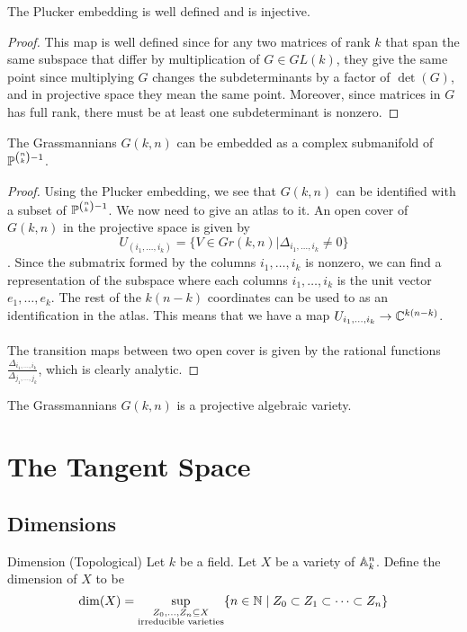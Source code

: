 \documentclass[a4paper]{article}
\begin{document}
\begin{prp}{}{} The Plucker embedding is well defined and is injective. \tcbline
\begin{proof}
This map is well defined since for any two matrices of rank $k$ that span the same subspace that differ by multiplication of $G\in GL(k)$, they give the same point since multiplying $G$ changes the subdeterminants by a factor of $\det(G)$, and in projective space they mean the same point. Moreover, since matrices in $G$ has full rank, there must be at least one subdeterminant is nonzero. 
\end{proof}
\end{prp}

\begin{thm}{}{} The Grassmannians $G(k,n)$ can be embedded as a complex submanifold of $\mathbb{P}^{\binom{n}{k}-1}$. \tcbline
\begin{proof}
Using the Plucker embedding, we see that $G(k,n)$ can be identified with a subset of $\mathbb{P}^{\binom{n}{k}-1}$. We now need to give an atlas to it. An open cover of $G(k,n)$ in the projective space is given by $$U_{(i_1,\dots,i_k)}=\{V\in Gr(k,n)|\Delta_{i_1,\dots,i_k}\neq 0\}$$. Since the submatrix formed by the columns $i_1,\dots,i_k$ is nonzero, we can find a representation of the subspace where each columns $i_1,\dots,i_k$ is the unit vector $e_1,\dots,e_k$. The rest of the $k(n-k)$ coordinates can be used to as an identification in the atlas. This means that we have a map $U_{i_1,\dots,i_k}\to\mathbb{C}^{k(n-k)}$. \\~\\
The transition maps between two open cover is given by the rational functions $\frac{\Delta_{i_1,\dots,i_k}}{\Delta_{j_1,\dots,j_k}}$, which is clearly analytic. 
\end{proof}
\end{thm}

\begin{thm}{}{} The Grassmannians $G(k,n)$ is a projective algebraic variety. 
\end{thm}


\pagebreak
\section{The Tangent Space}
\subsection{Dimensions}
\begin{defn}{Dimension (Topological)}{} Let $k$ be a field. Let $X$ be a variety of $\mathbb{A}_k^n$. Define the dimension of $X$ to be $$\dim(X)=\sup_{\substack{Z_0,\dots,Z_n\subseteq X\\\text{irreducible varieties}}}\{n\in\mathbb{N}\;|\;Z_0\subset Z_1\subset\dots\subset Z_n\}$$
\end{defn}
\end{document}
